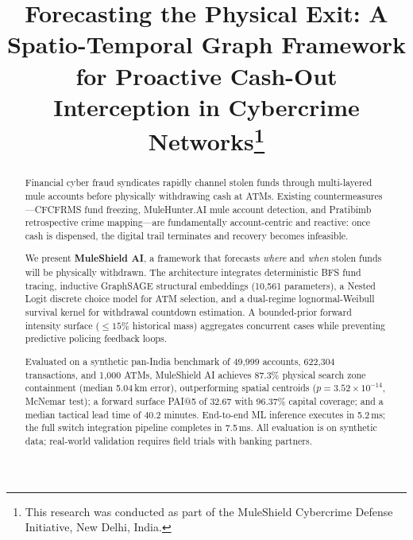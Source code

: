 \documentclass[conference]{IEEEtran}
\begin{document}
\title{Forecasting the Physical Exit: A Spatio-Temporal Graph Framework for Proactive Cash-Out Interception in Cybercrime Networks\thanks{This research was conducted as part of the MuleShield Cybercrime Defense Initiative, New Delhi, India.}
}

\author{
}

\maketitle

\begin{abstract}
Financial cyber fraud syndicates rapidly channel stolen funds through multi-layered mule accounts before physically withdrawing cash at ATMs. Existing countermeasures---CFCFRMS fund freezing, MuleHunter.AI mule account detection, and Pratibimb retrospective crime mapping---are fundamentally account-centric and reactive: once cash is dispensed, the digital trail terminates and recovery becomes infeasible.

We present \textbf{MuleShield AI}, a framework that forecasts \textit{where} and \textit{when} stolen funds will be physically withdrawn. The architecture integrates deterministic BFS fund tracing, inductive GraphSAGE structural embeddings (10,561 parameters), a Nested Logit discrete choice model for ATM selection, and a dual-regime lognormal-Weibull survival kernel for withdrawal countdown estimation. A bounded-prior forward intensity surface ($\le 15\%$ historical mass) aggregates concurrent cases while preventing predictive policing feedback loops.

Evaluated on a synthetic pan-India benchmark of 49,999 accounts, 622,304 transactions, and 1,000 ATMs, MuleShield AI achieves 87.3\% physical search zone containment (median 5.04\,km error), outperforming spatial centroids ($p = 3.52 \times 10^{-14}$, McNemar test); a forward surface PAI@5 of 32.67 with 96.37\% capital coverage; and a median tactical lead time of 40.2 minutes. End-to-end ML inference executes in 5.2\,ms; the full switch integration pipeline completes in 7.5\,ms. All evaluation is on synthetic data; real-world validation requires field trials with banking partners.
\end{abstract}
\end{document}

